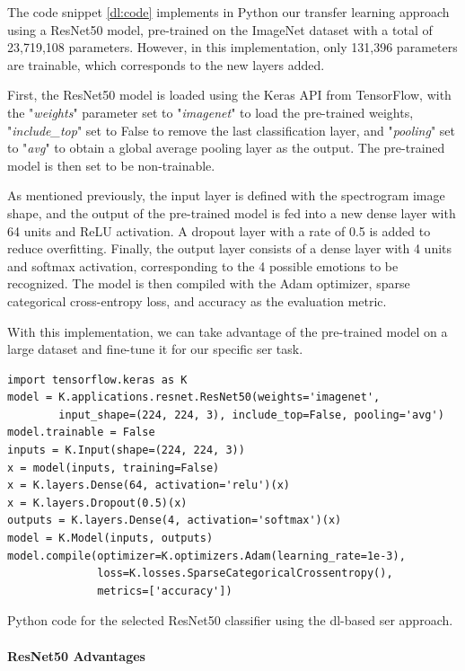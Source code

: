 The code snippet \ref{dl:code} implements in Python our transfer learning approach using a ResNet50 model, pre-trained on the ImageNet dataset with a total of 23,719,108 parameters. However, in this implementation, only 131,396 parameters are trainable, which corresponds to the new layers added.

First, the ResNet50 model is loaded using the Keras API from TensorFlow, with the "\textit{weights}" parameter set to "\textit{imagenet}" to load the pre-trained weights, "\textit{include\_top}" set to False to remove the last classification layer, and "\textit{pooling}" set to "\textit{avg}" to obtain a global average pooling layer as the output. The pre-trained model is then set to be non-trainable.

As mentioned previously, the input layer is defined with the spectrogram image shape, and the output of the pre-trained model is fed into a new dense layer with 64 units and ReLU activation. A dropout layer with a rate of 0.5 is added to reduce overfitting. Finally, the output layer consists of a dense layer with 4 units and softmax activation, corresponding to the 4 possible emotions to be recognized. The model is then compiled with the Adam optimizer, sparse categorical cross-entropy loss, and accuracy as the evaluation metric.

With this implementation, we can take advantage of the pre-trained model on a large dataset and fine-tune it for our specific \ac{ser} task.

\begin{listing}[H]
	\begin{verbatim}
import tensorflow.keras as K
model = K.applications.resnet.ResNet50(weights='imagenet',
		input_shape=(224, 224, 3), include_top=False, pooling='avg')
model.trainable = False
inputs = K.Input(shape=(224, 224, 3))
x = model(inputs, training=False)
x = K.layers.Dense(64, activation='relu')(x)
x = K.layers.Dropout(0.5)(x)
outputs = K.layers.Dense(4, activation='softmax')(x)
model = K.Model(inputs, outputs)
model.compile(optimizer=K.optimizers.Adam(learning_rate=1e-3),
			  loss=K.losses.SparseCategoricalCrossentropy(),
			  metrics=['accuracy'])
	\end{verbatim}
	\caption{Python code for the selected ResNet50 classifier using the \ac{dl}-based \ac{ser} approach.}
	\label{dl:code}
\end{listing}


\paragraph{ResNet50 Advantages}

